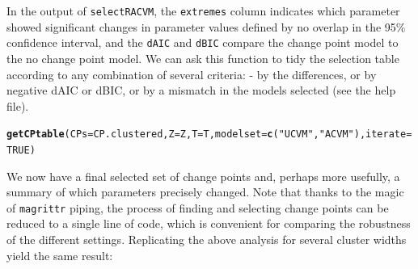 \documentclass[10pt]{article}\usepackage[]{graphicx}\usepackage[]{color}
\makeatletter
\newcommand{\hlnum}[1]{\textcolor[rgb]{0.686,0.059,0.569}{#1}}%
\newcommand{\hlstr}[1]{\textcolor[rgb]{0.192,0.494,0.8}{#1}}%
\newcommand{\hlstd}[1]{\textcolor[rgb]{0.345,0.345,0.345}{#1}}%
\newcommand{\hlkwc}[1]{\textcolor[rgb]{0.333,0.667,0.333}{#1}}%
\newcommand{\hlkwd}[1]{\textcolor[rgb]{0.737,0.353,0.396}{\textbf{#1}}}%
\newenvironment{kframe}{%
 \def\at@end@of@kframe{}%
 \ifinner\ifhmode%
  \def\at@end@of@kframe{\end{minipage}}%
  \begin{minipage}{\columnwidth}%
 \fi\fi%
 \def\FrameCommand##1{\hskip\@totalleftmargin \hskip-\fboxsep
 \colorbox{shadecolor}{##1}\hskip-\fboxsep
     \hskip-\linewidth \hskip-\@totalleftmargin \hskip\columnwidth}%
 \MakeFramed {\advance\hsize-\width
   \@totalleftmargin\z@ \linewidth\hsize
   \@setminipage}}%
 {\par\unskip\endMakeFramed%
 \at@end@of@kframe}
\newenvironment{knitrout}{}{} %
\makeatother
\begin{document}
\noindent In the output of \texttt{selectRACVM}, the \texttt{extremes} column indicates which parameter showed significant changes in parameter values defined by no overlap in the 95\% confidence interval, and the \texttt{dAIC} and \texttt{dBIC} compare the change point model to the no change point model.  We can ask this function to tidy the selection table according to any combination of several criteria: - by the differences, or by negative dAIC or dBIC, or by a mismatch in the models selected (see the help file). 

\begin{knitrout}
\color{fgcolor}\begin{kframe}
\begin{alltt}
\hlkwd{getCPtable}\hlstd{(}\hlkwc{CPs} \hlstd{= CP.clustered,} \hlkwc{Z} \hlstd{= Z,} \hlkwc{T} \hlstd{= T,} \hlkwc{modelset} \hlstd{=} \hlkwd{c}\hlstd{(}\hlstr{"UCVM"}\hlstd{,} \hlstr{"ACVM"}\hlstd{),}  \hlkwc{iterate} \hlstd{=} \hlnum{TRUE}\hlstd{)}
\end{alltt}


{\ttfamily\noindent\color{warningcolor}{\#\# Warning in min(i1): no non-missing arguments to min; returning Inf}}

{\ttfamily\noindent\color{warningcolor}{\#\# Warning in max(i2): no non-missing arguments to max; returning -Inf}}

{\ttfamily\noindent\bfseries\color{errorcolor}{\#\# Error in min(i1):max(i2): result would be too long a vector}}\end{kframe}
\end{knitrout}

\noindent We now have a final selected set of change points and, perhaps more usefully, a summary of which parameters precisely changed.  Note that thanks to the magic of \texttt{magrittr} piping, the process of finding and selecting change points can be reduced to a single line of code, which is convenient for comparing the robustness of the different settings.  Replicating the above analysis for several cluster widths yield the same result:
\end{document}
